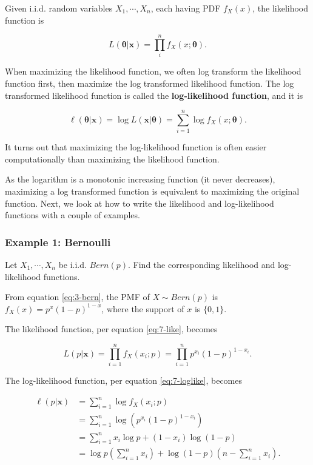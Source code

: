 \documentclass[
]{book}
\begin{document}
Given i.i.d. random variables \(X_1, \cdots, X_n\), each having PDF \(f_X(x)\), the likelihood function is

\begin{equation} 
L(\boldsymbol{\theta} | \boldsymbol{x} ) = \prod_i^n f_X(x; \boldsymbol{\theta}).
\label{eq:7-like}
\end{equation}

When maximizing the likelihood function, we often log transform the likelihood function first, then maximize the log transformed likelihood function. The log transformed likelihood function is called the \textbf{log-likelihood function}, and it is

\begin{equation} 
\ell(\boldsymbol{\theta} | \boldsymbol{x}) = \log L(\boldsymbol{x} | \boldsymbol{\theta}) = \sum_{i=1}^n \log f_X(x; \boldsymbol{\theta}).
\label{eq:7-loglike}
\end{equation}

It turns out that maximizing the log-likelihood function is often easier computationally than maximizing the likelihood function.

As the logarithm is a monotonic increasing function (it never decreases), maximizing a log transformed function is equivalent to maximizing the original function. Next, we look at how to write the likelihood and log-likelihood functions with a couple of examples.

\subsubsection{Example 1: Bernoulli}\label{example-1-bernoulli}

Let \(X_1, \cdots, X_n\) be i.i.d. \(Bern(p)\). Find the corresponding likelihood and log-likelihood functions.

From equation \eqref{eq:3-bern}, the PMF of \(X \sim Bern(p)\) is \(f_X(x) = p^x (1-p)^{1-x}\), where the support of \(x\) is \(\{0,1\}\).

The likelihood function, per equation \eqref{eq:7-like}, becomes

\[
L(p | \boldsymbol{x} ) = \prod_{i=1}^n f_X(x_i; p) = \prod_{i=1}^n p^{x_i} (1-p)^{1-x_i}.
\]

The log-likelihood function, per equation \eqref{eq:7-loglike}, becomes

\[
\begin{split}
\ell (p | \boldsymbol{x}) &= \sum_{i=1}^n \log f_X(x_i;p) \\
                          &= \sum_{i=1}^n \log \left( p^{x_i} (1-p)^{1-x_i} \right) \\
                          &= \sum_{i=1}^n x_i \log p + (1-x_i) \log (1-p) \\
                          &= \log p \left(\sum_{i=1}^n x_i \right) + \log (1-p) \left( n - \sum_{i=1}^n x_i \right).
\end{split}
\]
\end{document}
